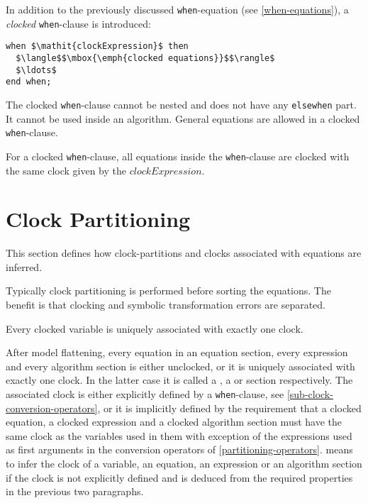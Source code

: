In addition to the previously discussed \lstinline!when!-equation (see \cref{when-equations}), a \emph{clocked} \lstinline!when!-clause is introduced:
\begin{lstlisting}[language=modelica]
when $\mathit{clockExpression}$ then
  $\langle$$\mbox{\emph{clocked equations}}$$\rangle$
  $\ldots$
end when;
\end{lstlisting}

The clocked \lstinline!when!-clause cannot be nested and does not have any \lstinline!elsewhen! part.
It cannot be used inside an algorithm.
General equations are allowed in a clocked \lstinline!when!-clause.

For a clocked \lstinline!when!-clause, all equations inside the \lstinline!when!-clause are clocked with the same clock given by the $\mathit{clockExpression}$.

\section{Clock Partitioning}\label{clock-partitioning}

This section defines how clock-partitions and clocks associated with equations are inferred.

\begin{nonnormative}
Typically clock partitioning is performed before sorting the equations.
The benefit is that clocking and symbolic transformation errors are separated.
\end{nonnormative}

Every clocked variable is uniquely associated with exactly one clock.

After model flattening, every equation in an equation section, every expression and every algorithm section is either unclocked, or it is uniquely associated with exactly one clock.
In the latter case it is called a , a  or  section respectively.
The associated clock is either explicitly defined by a \lstinline!when!-clause, see \cref{sub-clock-conversion-operators}, or it is implicitly defined by the requirement that a clocked equation, a clocked expression and a clocked algorithm section must have the same clock as the variables used in them with exception of the expressions used as first arguments in the conversion operators of \cref{partitioning-operators}.
 means to infer the clock of a variable, an equation, an expression or an algorithm section if the clock is not explicitly defined and is deduced from the required properties in the previous two paragraphs.

